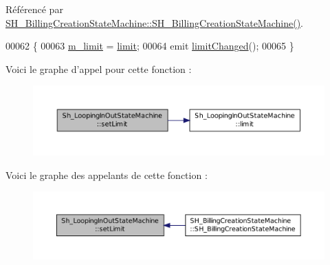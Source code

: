 Référencé par \hyperlink{classSH__BillingCreationStateMachine_ad62b77fa4aeafe200056ff3974562f83}{S\-H\-\_\-\-Billing\-Creation\-State\-Machine\-::\-S\-H\-\_\-\-Billing\-Creation\-State\-Machine()}.


\begin{DoxyCode}
00062 \{
00063     \hyperlink{classSh__LoopingInOutStateMachine_a320ece6cf74c2667c70059b9421117fb}{m\_limit} = \hyperlink{classSh__LoopingInOutStateMachine_ac44b7158256f09b878c8958cf3ae3bf8}{limit};
00064     emit \hyperlink{classSh__LoopingInOutStateMachine_a5b65ad7a49294022ff781c71c4702157}{limitChanged}();
00065 \}
\end{DoxyCode}


Voici le graphe d'appel pour cette fonction \-:\nopagebreak
\begin{figure}[H]
\begin{center}
\leavevmode
\includegraphics[width=350pt]{classSh__LoopingInOutStateMachine_ab5e9ac94cbd9a47a45dcb50e777c398b_cgraph}
\end{center}
\end{figure}




Voici le graphe des appelants de cette fonction \-:\nopagebreak
\begin{figure}[H]
\begin{center}
\leavevmode
\includegraphics[width=350pt]{classSh__LoopingInOutStateMachine_ab5e9ac94cbd9a47a45dcb50e777c398b_icgraph}
\end{center}
\end{figure}


